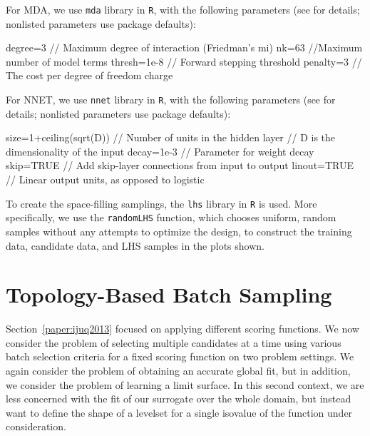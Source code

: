 For MDA, we use \texttt{mda} library in \texttt{R}, with the following parameters (see \cite{mda} for details; nonlisted parameters use package defaults):
\begin{code}
degree=3 // Maximum degree of interaction (Friedman's mi)
nk=63  //Maximum number of model terms
thresh=1e-8 // Forward stepping threshold
penalty=3 // The cost per degree of freedom charge
\end{code}

For NNET, we use \texttt{nnet} library in \texttt{R}, with the following parameters (see \cite{nnet} for details; nonlisted parameters use package defaults):
\begin{code}
size=1+ceiling(sqrt(D)) // Number of units in the hidden layer
                        // D is the dimensionality of the input
decay=1e-3 // Parameter for weight decay
skip=TRUE // Add skip-layer connections from input to output
linout=TRUE // Linear output units, as opposed to logistic
\end{code}

To create the space-filling samplings, the \texttt{lhs} library in \texttt{R} \cite{lhs} is used.
%
More specifically, we use the \texttt{randomLHS} function, which chooses uniform, random samples without any attempts to optimize the design, to construct the training data, candidate data, and LHS samples in the plots shown.


\section{Topology-Based Batch Sampling}
\label{paper:batch}

Section~\ref{paper:ijuq2013} focused on applying different scoring functions.
%
We now consider the problem of selecting multiple candidates at a time using various batch selection criteria for a fixed scoring function on two problem settings.
%
We again consider the problem of obtaining an accurate global fit, but in addition, we consider the problem of learning a limit surface.
%
In this second context, we are less concerned with the fit of our surrogate over the whole domain, but instead want to define the shape of a levelset for a single isovalue of the function under consideration.


